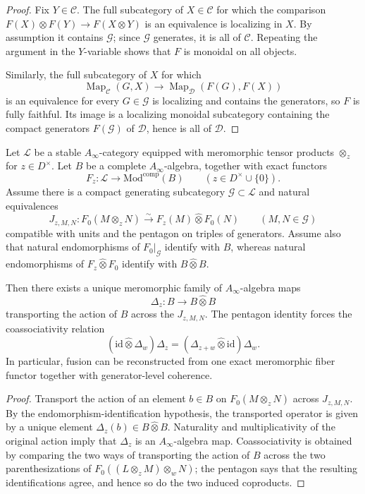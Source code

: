 \begin{proof}
Fix $Y\in\mathcal{C}$. The full subcategory of $X\in\mathcal{C}$ for which the
comparison $F(X)\otimes F(Y)\to F(X\otimes Y)$ is an equivalence is localizing
in $X$. By assumption it contains $\mathcal{G}$; since $\mathcal{G}$ generates,
it is all of $\mathcal{C}$. Repeating the argument in the $Y$-variable shows
that $F$ is monoidal on all objects.

Similarly, the full subcategory of $X$ for which
\[
\operatorname{Map}_{\mathcal{C}}(G,X)
\longrightarrow
\operatorname{Map}_{\mathcal{D}}(F(G),F(X))
\]
is an equivalence for every $G\in\mathcal{G}$ is localizing and contains the
generators, so $F$ is fully faithful. Its image is a localizing monoidal
subcategory containing the compact generators $F(\mathcal{G})$ of
$\mathcal{D}$, hence is all of $\mathcal{D}$.
\end{proof}

\begin{theorem}
\label{thm:meromorphic-tannakian-reconstruction}
Let $\mathcal{L}$ be a stable $A_\infty$-category equipped with meromorphic
tensor products $\otimes_z$ for $z\in D^\times$. Let $B$ be a complete
$A_\infty$-algebra, together with exact functors
\[
F_z\colon \mathcal{L}\to \mathrm{Mod}^{\mathrm{comp}}(B)
\qquad (z\in D^\times\cup\{0\}).
\]
Assume there is a compact generating subcategory $\mathcal{G}\subset\mathcal{L}$
and natural equivalences
\[
J_{z,M,N}\colon F_0(M\otimes_zN)
\xrightarrow{\sim}
F_z(M)\widehat{\otimes}F_0(N)
\qquad (M,N\in\mathcal{G})
\]
compatible with units and the pentagon on triples of generators. Assume also
that natural endomorphisms of $F_0|_{\mathcal{G}}$ identify with $B$, whereas
natural endomorphisms of $F_z\widehat{\otimes}F_0$ identify with
$B\widehat{\otimes}B$.

Then there exists a unique meromorphic family of $A_\infty$-algebra maps
\[
\Delta_z\colon B\to B\widehat{\otimes}B
\]
transporting the action of $B$ across the $J_{z,M,N}$. The pentagon identity
forces the coassociativity relation
\[
(\mathrm{id}\widehat{\otimes}\Delta_w)\Delta_z
=
(\Delta_{z+w}\widehat{\otimes}\mathrm{id})\Delta_w.
\]
In particular, fusion can be reconstructed from one exact meromorphic fiber
functor together with generator-level coherence.
\end{theorem}

\begin{proof}
Transport the action of an element $b\in B$ on $F_0(M\otimes_zN)$ across
$J_{z,M,N}$. By the endomorphism-identification hypothesis, the transported
operator is given by a unique element $\Delta_z(b)\in B\widehat{\otimes}B$.
Naturality and multiplicativity of the original action imply that $\Delta_z$ is
an $A_\infty$-algebra map. Coassociativity is obtained by comparing the two
ways of transporting the action of $B$ across the two parenthesizations of
$F_0((L\otimes_zM)\otimes_wN)$; the pentagon says that the resulting
identifications agree, and hence so do the two induced coproducts.
\end{proof}

